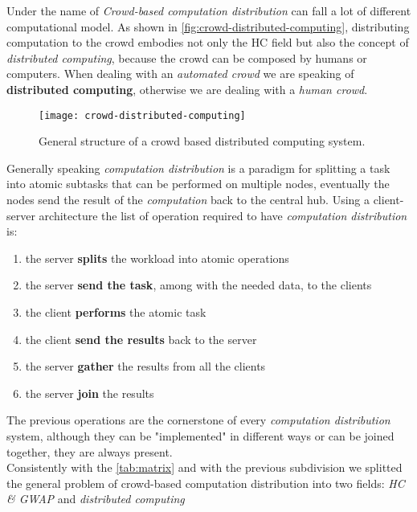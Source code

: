 

Under the name of \emph{Crowd-based computation distribution} can fall a lot of
different computational model. As shown in
\autoref{fig:crowd-distributed-computing}, distributing computation to the crowd
embodies not only the \ac{HC} field but also the concept of \emph{distributed
computing}, because the crowd can be composed by humans or computers. When dealing
with an \emph{automated crowd} we are speaking of \textbf{distributed computing},
otherwise we are dealing with a \emph{human crowd}.
\begin{figure}[htb]
    \centering
    \texttt{[image: crowd-distributed-computing]}
    \caption{General structure of a crowd based distributed computing system.}
    \label{fig:crowd-distributed-computing}
\end{figure}

Generally speaking \emph{computation distribution} is a paradigm for splitting
a task into atomic subtasks that can be performed on multiple nodes, eventually
the nodes send the result of the \emph{computation} back to the central hub.
Using a client-server architecture the list of operation required to have
\emph{computation distribution} is:
\begin{enumerate}
    \item the server \textbf{splits} the workload into atomic operations
    \item the server \textbf{send the task}, among with the needed data, to the
    clients
    \item the client \textbf{performs} the atomic task
    \item the client \textbf{send the results} back to the server
    \item the server \textbf{gather} the results from all the clients
    \item the server \textbf{join} the results
\end{enumerate}
The previous operations are the cornerstone of every \emph{computation
distribution} system, although they can be "implemented" in different ways or can
be joined together, they are always present.\\

Consistently with the \autoref{tab:matrix} and with the previous subdivision we
splitted the general problem of crowd-based computation distribution into two
fields: \emph{\acl{HC} \& \acl{GWAP}} and \emph{distributed computing}

